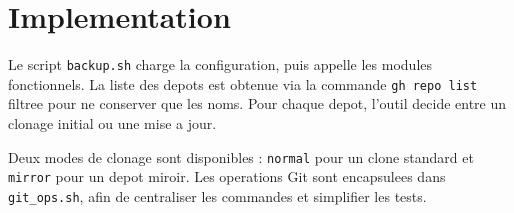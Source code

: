 \section{Implementation}
Le script \texttt{backup.sh} charge la configuration, puis appelle les modules
fonctionnels. La liste des depots est obtenue via la commande \texttt{gh repo list}
filtree pour ne conserver que les noms. Pour chaque depot, l'outil decide entre un
clonage initial ou une mise a jour.

Deux modes de clonage sont disponibles : \texttt{normal} pour un clone standard et
\texttt{mirror} pour un depot miroir. Les operations Git sont encapsulees dans
\texttt{git\_ops.sh}, afin de centraliser les commandes et simplifier les tests.
